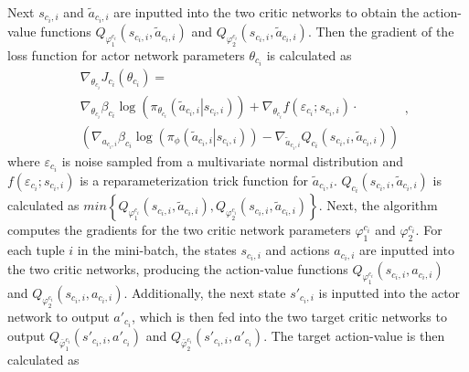 \documentclass[lettersize,journal,onecolumn]{IEEEtran}
\begin{document}
Next ${{s}_{{{c}_{i}},i}}$ and ${{\tilde{a}}_{{{c}_{i}},i}}$ are inputted into the two critic networks to obtain the action-value functions ${{Q}_{\varphi _{1}^{{{c}_{i}}}}}\left( {{s}_{{{c}_{i}},i}},{{{\tilde{a}}}_{{{c}_{i}},i}} \right)$ and ${{Q}_{\varphi _{2}^{{{c}_{i}}}}}\left( {{s}_{{{c}_{i}},i}},{{{\tilde{a}}}_{{{c}_{i}},i}} \right)$. Then the gradient of the loss function for actor network parameters ${{\theta }_{{{c}_{i}}}}$ is calculated as
\begin{equation}
\begin{aligned}
  & {{\nabla }_{{{\theta }_{{{c}_{i}}}}}}{{J}_{{{c}_{i}}}}({{\theta }_{{{c}_{i}}}})= \\
  & {{\nabla }_{{{\theta }_{{{c}_{i}}}}}}{{\beta }_{{{c}_{i}}}}\log \left( {{\pi }_{{{\theta }_{{{c}_{i}}}}}}\left( {{{\tilde{a}}}_{{{c}_{i}},i}}\left| {{s}_{{{c}_{i}},i}} \right. \right) \right)+{{\nabla }_{{{\theta }_{{{c}_{i}}}}}}f\left( {{\varepsilon }_{{{c}_{i}}}};{{s}_{{{c}_{i}},i}} \right)\cdot  \\ 
 & \left( {{\nabla }_{{{a}_{{{c}_{i}},i{ }}}}}{{\beta }_{{{c}_{i}}}}\log \left( {{\pi }_{\phi }}\left( {{{\tilde{a}}}_{{{c}_{i}},i}}\left| {{s}_{{{c}_{i}},i}} \right. \right) \right)-{{\nabla }_{{{{\tilde{a}}}_{{{c}_{i}},i}}}}{{Q}_{{{c}_{i}}}}\left( {{s}_{{{c}_{i}},i}},{{{\tilde{a}}}_{{{c}_{i}},i}} \right) \right)  
\end{aligned}
\label{eq30},
\end{equation}
where ${{\varepsilon }_{{{c}_{i}}}}$ is noise sampled from a multivariate normal distribution and $f\left( {{\varepsilon }_{{{c}_{i}}}};{{s}_{{{c}_{i}},i}} \right)$ is a reparameterization trick function for ${{\tilde{a}}_{{{c}_{i}},i}}$. ${{Q}_{{{c}_{i}}}}\left( {{s}_{{{c}_{i}},i}},{{{\tilde{a}}}_{{{c}_{i}},i}} \right)$ is calculated as $min\left\{ {{Q}_{\varphi _{1}^{{{c}_{i}}}}}\left( {{s}_{{{c}_{i}},i}},{{{\tilde{a}}}_{{{c}_{i}},i}} \right),{{Q}_{\varphi _{2}^{{{c}_{i}}}}}\left( {{s}_{{{c}_{i}},i}},{{{\tilde{a}}}_{{{c}_{i}},i}} \right) \right\}$.
Next, the algorithm computes the gradients for the two critic network parameters $\varphi _{1}^{{{c}_{i}}}$ and $\varphi _{2}^{{{c}_{i}}}$. For each tuple $i$ in the mini-batch, the states ${{s}_{{{c}_{i}},i}}$ and actions ${{a}_{{{c}_{i}},i}}$ are inputted into the two critic networks, producing the action-value functions ${{Q}_{\varphi _{1}^{{{c}_{i}}}}}\left( {{s}_{{{c}_{i}},i}},{{a}_{{{c}_{i}},i}} \right)$ and ${{Q}_{\varphi _{2}^{{{c}_{i}}}}}\left( {{s}_{{{c}_{i}},i}},{{a}_{{{c}_{i}},i}} \right)$. Additionally, the next state ${{{s}'}_{{{c}_{i}},i}}$ is inputted into the actor network to output ${{{a}'}_{{{c}_{i}}}}$, which is then fed into the two target critic networks to output ${{Q}_{\bar{\varphi }_{1}^{{{c}_{i}}}}}\left( {{{{s}'}}_{{{c}_{i}},i}},{{{{a}'}}_{{{c}_{i}}}} \right)$ and ${{Q}_{\bar{\varphi }_{2}^{{{c}_{i}}}}}\left( {{{{s}'}}_{{{c}_{i}},i}},{{{{a}'}}_{{{c}_{i}}}} \right)$. The target action-value is then calculated as
\end{document}
